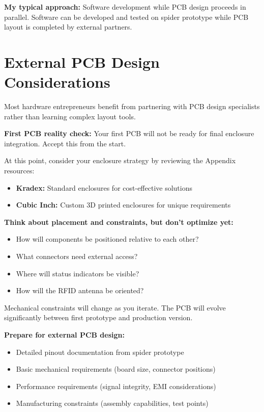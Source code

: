 \textbf{My typical approach:} Software development while PCB design proceeds in parallel. Software can be developed and tested on spider prototype while PCB layout is completed by external partners.

\section{External PCB Design Considerations}

Most hardware entrepreneurs benefit from partnering with PCB design specialists rather than learning complex layout tools.

\textbf{First PCB reality check:}
Your first PCB will not be ready for final enclosure integration. Accept this from the start.

At this point, consider your enclosure strategy by reviewing the Appendix resources:
\begin{itemize}
\item \textbf{Kradex:} Standard enclosures for cost-effective solutions
\item \textbf{Cubic Inch:} Custom 3D printed enclosures for unique requirements
\end{itemize}

\textbf{Think about placement and constraints, but don't optimize yet:}
\begin{itemize}
\item How will components be positioned relative to each other?
\item What connectors need external access?
\item Where will status indicators be visible?
\item How will the RFID antenna be oriented?
\end{itemize}

Mechanical constraints will change as you iterate. The PCB will evolve significantly between first prototype and production version.

\textbf{Prepare for external PCB design:}
\begin{itemize}
\item Detailed pinout documentation from spider prototype
\item Basic mechanical requirements (board size, connector positions)
\item Performance requirements (signal integrity, EMI considerations)
\item Manufacturing constraints (assembly capabilities, test points)
\end{itemize}


